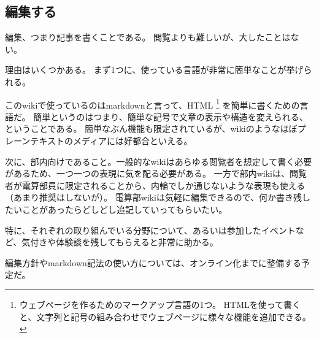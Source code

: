 \documentclass[lualatex,ja=standard,12pt,a4j]{bxjsbook}
\begin{document}
            \subsection{編集する}
            	編集、つまり記事を書くことである。
                閲覧よりも難しいが、大したことはない。
                
                理由はいくつかある。
                まず1つに、使っている言語が非常に簡単なことが挙げられる。
                
                このwikiで使っているのはmarkdownと言って、HTML
                \footnote{ウェブページを作るためのマークアップ言語の1つ。
                HTMLを使って書くと、文字列と記号の組み合わせでウェブページに様々な機能を追加できる。}
                を簡単に書くための言語だ。
                簡単というのはつまり、簡単な記号で文章の表示や構造を変えられる、ということである。
                簡単なぶん機能も限定されているが、wikiのようなほぼプレーンテキストのメディアには好都合といえる。
                
                次に、部内向けであること。一般的なwikiはあらゆる閲覧者を想定して書く必要があるため、一つ一つの表現に気を配る必要がある。
                一方で部内wikiは、閲覧者が電算部員に限定されることから、内輪でしか通じないような表現も使える（あまり推奨はしないが）。
                電算部wikiは気軽に編集できるので、何か書き残したいことがあったらどしどし追記していってもらいたい。
                
                特に、それぞれの取り組んでいる分野について、あるいは参加したイベントなど、気付きや体験談を残してもらえると非常に助かる。
                
                編集方針やmarkdown記法の使い方については、オンライン化までに整備する予定だ。
                
\end{document}
